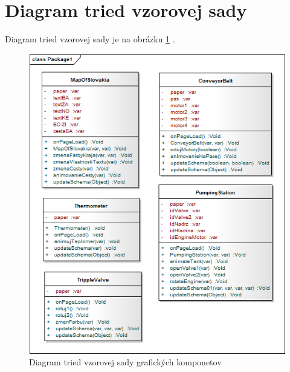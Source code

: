 \section{Diagram tried vzorovej sady}
Diagram tried vzorovej sady je na obrázku \ref{fig:classD} . 
\begin{figure}[hp]
	\centering
	\includegraphics[width=0.9\linewidth]{uml/classDiagramTried}
	\caption{Diagram tried vzorovej sady grafických komponetov}
	\label{fig:classD}
\end{figure}
